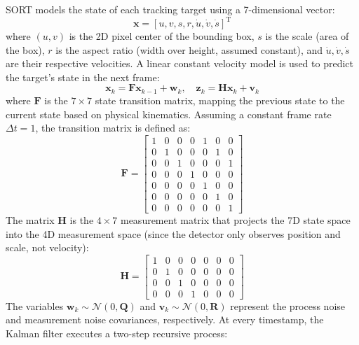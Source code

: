 \documentclass[11pt,a4paper]{report}
\begin{document}
SORT models the state of each tracking target using a 7-dimensional vector:
\begin{equation}
    \mathbf{x} = [u, v, s, r, \dot{u}, \dot{v}, \dot{s}]^{\text{T}}
\end{equation}
where $(u, v)$ is the 2D pixel center of the bounding box, $s$ is the scale (area of the box), $r$ is the aspect ratio (width over height, assumed constant), and $\dot{u}, \dot{v}, \dot{s}$ are their respective velocities. 
A linear constant velocity model is used to predict the target's state in the next frame:
\begin{equation}
    \mathbf{x}_{k} = \mathbf{F} \mathbf{x}_{k-1} + \mathbf{w}_k, \quad \mathbf{z}_k = \mathbf{H} \mathbf{x}_k + \mathbf{v}_k
\end{equation}
where $\mathbf{F}$ is the $7 \times 7$ state transition matrix, mapping the previous state to the current state based on physical kinematics. Assuming a constant frame rate $\Delta t = 1$, the transition matrix is defined as:
\begin{equation}
    \mathbf{F} = \begin{bmatrix}
    1 & 0 & 0 & 0 & 1 & 0 & 0 \\
    0 & 1 & 0 & 0 & 0 & 1 & 0 \\
    0 & 0 & 1 & 0 & 0 & 0 & 1 \\
    0 & 0 & 0 & 1 & 0 & 0 & 0 \\
    0 & 0 & 0 & 0 & 1 & 0 & 0 \\
    0 & 0 & 0 & 0 & 0 & 1 & 0 \\
    0 & 0 & 0 & 0 & 0 & 0 & 1
    \end{bmatrix}
\end{equation}
The matrix $\mathbf{H}$ is the $4 \times 7$ measurement matrix that projects the 7D state space into the 4D measurement space (since the detector only observes position and scale, not velocity):
\begin{equation}
    \mathbf{H} = \begin{bmatrix}
    1 & 0 & 0 & 0 & 0 & 0 & 0 \\
    0 & 1 & 0 & 0 & 0 & 0 & 0 \\
    0 & 0 & 1 & 0 & 0 & 0 & 0 \\
    0 & 0 & 0 & 1 & 0 & 0 & 0
    \end{bmatrix}
\end{equation}
The variables $\mathbf{w}_k \sim \mathcal{N}(0, \mathbf{Q})$ and $\mathbf{v}_k \sim \mathcal{N}(0, \mathbf{R})$ represent the process noise and measurement noise covariances, respectively. At every timestamp, the Kalman filter executes a two-step recursive process:
\end{document}
